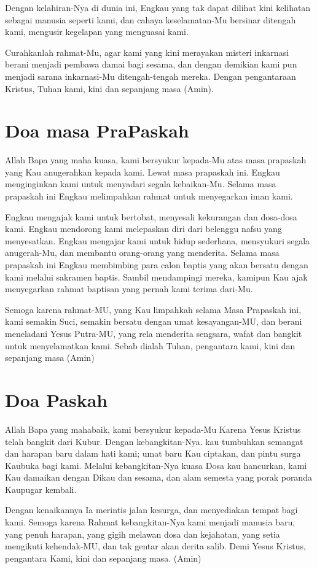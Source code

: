 Dengan kelahiran-Nya di dunia ini, Engkau yang tak dapat dilihat kini
kelihatan sebagai manusia seperti kami, dan cahaya keselamatan-Mu
bersinar ditengah kami, mengusir kegelapan yang menguasai kami.

Curahkanlah rahmat-Mu, agar kami yang kini merayakan misteri inkarnasi
berani menjadi pembawa damai bagi sesama, dan dengan demikian kami pun
menjadi sarana inkarnasi-Mu ditengah-tengah mereka. Dengan pengantaraan
Kristus, Tuhan kami, kini dan sepanjang masa (Amin).

\section[Doa masa PraPaskah]{Doa masa PraPaskah}
Allah Bapa yang maha kuasa, kami bersyukur kepada-Mu atas masa prapaskah
yang Kau anugerahkan kepada kami. Lewat masa prapaskah ini. Engkau
menginginkan kami untuk menyadari segala kebaikan-Mu. Selama masa
prapaskah ini Engkau melimpahkan rahmat untuk menyegarkan iman kami.

Engkau mengajak kami untuk bertobat, menyesali kekurangan dan dosa-dosa
kami. Engkau mendorong kami melepaskan diri dari belenggu nafsu yang
menyesatkan. Engkau mengajar kami untuk hidup sederhana, mensyukuri
segala anugerah-Mu, dan membantu orang-orang yang menderita. Selama
masa prapaskah ini Engkau membimbing para calon baptis yang akan
bersatu dengan kami melalui sakramen baptis. Sambil mendampingi mereka,
kamipun Kau ajak menyegarkan rahmat baptisan yang pernah kami terima
dari-Mu.

Semoga karena rahmat-MU, yang Kau limpahkah selama Masa Prapaskah ini,
kami semakin Suci, semakin bersatu dengan umat kesayangan-MU, dan
berani meneladani Yesus Putra-MU, yang rela menderita sengsara, wafat
dan bangkit untuk menyelamatkan kami. Sebab dialah Tuhan, pengantara
kami, kini dan sepanjang masa (Amin)

\section[Doa Paskah]{Doa Paskah}
Allah Bapa yang mahabaik, kami bersyukur kepada-Mu Karena Yesus Kristus
telah bangkit dari Kubur. Dengan kebangkitan-Nya. kau tumbuhkan
semangat dan harapan baru dalam hati kami; umat baru Kau ciptakan, dan
pintu surga Kaubuka bagi kami. Melalui kebangkitan-Nya kuasa Dosa kau
hancurkan, kami Kau damaikan dengan Dikau dan sesama, dan alam semesta
yang porak poranda Kaupugar kembali.

Dengan kenaikannya Ia merintis jalan kesurga, dan menyediakan tempat
bagi kami. Semoga karena Rahmat kebangkitan-Nya kami menjadi manusia
baru, yang penuh harapan, yang gigih melawan dosa dan kejahatan, yang
setia mengikuti kehendak-MU, dan tak gentar akan derita salib. Demi
Yesus Kristus, pengantara Kami, kini dan sepanjang masa. (Amin)
\normalsize

